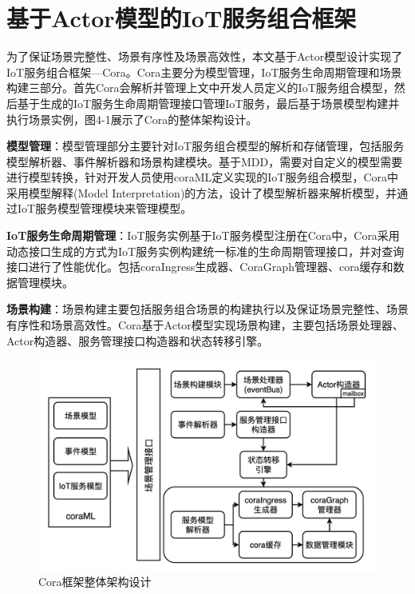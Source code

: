 \documentclass[winfonts,master,twoside]{njuthesis}
\begin{document}
\chapter{基于Actor模型的IoT服务组合框架}
为了保证场景完整性、场景有序性及场景高效性，本文基于Actor模型设计实现了IoT服务组合框架—Cora。Cora主要分为模型管理，IoT服务生命周期管理和场景构建三部分。首先Cora会解析并管理上文中开发人员定义的IoT服务组合模型，然后基于生成的IoT服务生命周期管理接口管理IoT服务，最后基于场景模型构建并执行场景实例，图4-1展示了Cora的整体架构设计。

\textbf{模型管理}：模型管理部分主要针对IoT服务组合模型的解析和存储管理，包括服务模型解析器、事件解析器和场景构建模块。基于MDD，需要对自定义的模型需要进行模型转换，针对开发人员使用coraML定义实现的IoT服务组合模型，Cora中采用模型解释(Model Interpretation)的方法，设计了模型解析器来解析模型，并通过IoT服务模型管理模块来管理模型。

\textbf{IoT服务生命周期管理}：IoT服务实例基于IoT服务模型注册在Cora中，Cora采用动态接口生成的方式为IoT服务实例构建统一标准的生命周期管理接口，并对查询接口进行了性能优化。包括coraIngress生成器、CoraGraph管理器、cora缓存和数据管理模块。

\textbf{场景构建}：场景构建主要包括服务组合场景的构建执行以及保证场景完整性、场景有序性和场景高效性。Cora基于Actor模型实现场景构建，主要包括场景处理器、Actor构造器、服务管理接口构造器和状态转移引擎。

\begin{figure}
	\centering
	\includegraphics[width=\textwidth]{figure/4-cora/architecture.png}
	\caption{Cora框架整体架构设计}
	\label{overview}
\end{figure}
\end{document}
